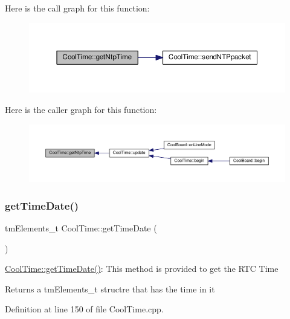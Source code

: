 Here is the call graph for this function\+:
\nopagebreak
\begin{figure}[H]
\begin{center}
\leavevmode
\includegraphics[width=350pt]{classCoolTime_a41fbbbfd651c2079f54d4b2911e4c705_cgraph}
\end{center}
\end{figure}
Here is the caller graph for this function\+:
\nopagebreak
\begin{figure}[H]
\begin{center}
\leavevmode
\includegraphics[width=350pt]{classCoolTime_a41fbbbfd651c2079f54d4b2911e4c705_icgraph}
\end{center}
\end{figure}
\mbox{\label{classCoolTime_a7a7501c5ca77dd1248bea704c44f986c}} 
\subsubsection{\texorpdfstring{get\+Time\+Date()}{getTimeDate()}}
{\footnotesize\ttfamily tm\+Elements\+\_\+t Cool\+Time\+::get\+Time\+Date (\begin{DoxyParamCaption}{ }\end{DoxyParamCaption})}

\hyperlink{classCoolTime_a7a7501c5ca77dd1248bea704c44f986c}{Cool\+Time\+::get\+Time\+Date()}\+: This method is provided to get the R\+TC Time

\begin{DoxyReturn}{Returns}
a tm\+Elements\+\_\+t structre that has the time in it 
\end{DoxyReturn}


Definition at line 150 of file Cool\+Time.\+cpp.



